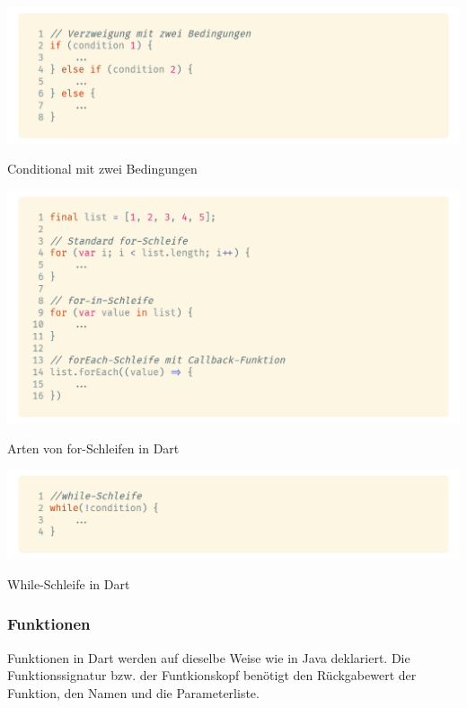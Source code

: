 \begin{code}
    \centering
    \includegraphics[width=1\textwidth]{images/Dart/theory/dartConditional.png}
    \caption{Conditional mit zwei Bedingungen}
\end{code}

\begin{code}
    \centering
    \includegraphics[width=1\textwidth]{images/Dart/theory/dartForLoop.png}
    \caption{Arten von for-Schleifen in Dart}
\end{code}

\begin{code}
    \centering
    \includegraphics[width=1\textwidth]{images/Dart/theory/dartWhileLoops.png}
    \caption{While-Schleife in Dart}
\end{code}

\newpage

\subsubsection{Funktionen}

Funktionen in Dart werden auf dieselbe Weise wie in Java deklariert. Die Funktionssignatur 
bzw. der Funtkionskopf benötigt den Rückgabewert der Funktion, den Namen und die Parameterliste.

